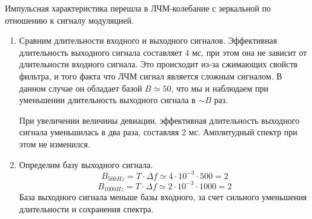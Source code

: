 Импульсная характеристика перешла в ЛЧМ-колебание с зеркальной по отношению к сигналу модуляцией.
\begin{enumerate}
    \item Сравним длительности входного и выходного сигналов. Эффективная длительность выходного сигнала составляет 4
    мс, при этом она не зависит от длительности входного сигнала. Это происходит из-за сжимающих свойств фильтра, и того
    факта что ЛЧМ сигнал является сложным сигналом. В данном случае он обладает базой $B \simeq 50$, что мы и наблюдаем
    при уменьшении длительность выходного сигнала в $\sim B$ раз.

    При увеличении величины девиации, эффективная длительность выходного сигнала уменьшилась в два раза, составляя 2 мс.
    Амплитудный спектр при этом не изменился.
    \item Определим базу выходного сигнала. 
    \begin{equation}
        B_{500 Hz} = T \cdot \Delta f \simeq 4 \cdot 10^{-3} \cdot 500 = 2
    \end{equation}
    \begin{equation}
        B_{1000 Hz} = T \cdot \Delta f \simeq 2 \cdot 10^{-3} \cdot 1000 = 2
    \end{equation}
    База выходного сигнала меньше базы входного, за счет сильного уменьшения длительности и сохранения спектра.
\end{enumerate}


